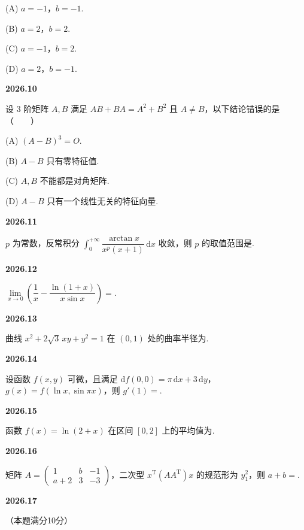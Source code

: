 \documentclass[UTF8,12pt,fontset=windows]{ctexart}
\begin{document}
(A) $a=-1$，$b=-1$.

(B) $a=2$，$b=2$.

(C) $a=-1$，$b=2$.

(D) $a=2$，$b=-1$.

\vfill
\newpage
{\large\bfseries 2026.10}

设 $3$ 阶矩阵 $A,B$ 满足 $AB+BA=A^2+B^2$ 且 $A\neq B$，以下结论错误的是（　　）

(A) $(A-B)^3=O$.

(B) $A-B$ 只有零特征值.

(C) $A,B$ 不能都是对角矩阵.

(D) $A-B$ 只有一个线性无关的特征向量.

\vfill
\newpage
{\large\bfseries 2026.11}

$p$ 为常数，反常积分 $\displaystyle\int_0^{+\infty}\dfrac{\arctan x}{x^p(x+1)}\,\mathrm{d}x$ 收敛，则 $p$ 的取值范围是\underline{\hspace{20mm}}.

\vfill
\newpage
{\large\bfseries 2026.12}

$\lim\limits_{x\to0}\left(\dfrac1x-\dfrac{\ln(1+x)}{x\sin x}\right)=$\underline{\hspace{20mm}}.

\vfill
\newpage
{\large\bfseries 2026.13}

曲线 $x^2+2\sqrt3\,xy+y^2=1$ 在 $(0,1)$ 处的曲率半径为\underline{\hspace{20mm}}.

\vfill
\newpage
{\large\bfseries 2026.14}

设函数 $f(x,y)$ 可微，且满足 $\mathrm{d}f(0,0)=\pi\,\mathrm{d}x+3\,\mathrm{d}y$，$g(x)=f(\ln x,\sin\pi x)$，则 $g'(1)=$\underline{\hspace{20mm}}.

\vfill
\newpage
{\large\bfseries 2026.15}

函数 $f(x)=\ln(2+x)$ 在区间 $[0,2]$ 上的平均值为\underline{\hspace{20mm}}.

\vfill
\newpage
{\large\bfseries 2026.16}

矩阵 $A=\begin{pmatrix}1&b&-1\\a+2&3&-3\end{pmatrix}$，二次型 $x^{\mathrm{T}}(AA^{\mathrm{T}})x$ 的规范形为 $y_1^2$，则 $a+b=$\underline{\hspace{20mm}}.

\vfill
\newpage
{\large\bfseries 2026.17}

（本题满分10分）
\end{document}
